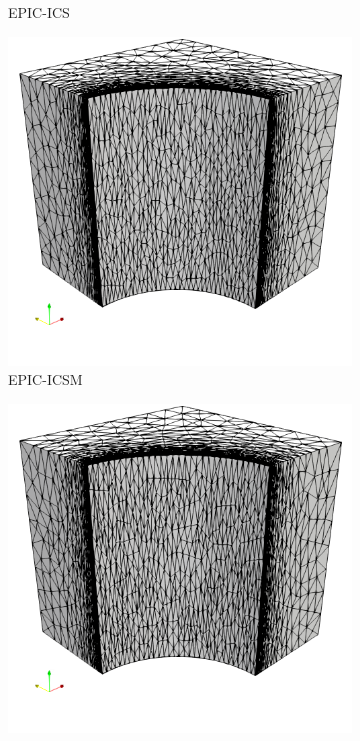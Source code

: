 \documentclass[3p,times,procedia,number]{elsarticle}
\begin{document}
\begin{figure}
\begin{subfigure}{.24\textwidth}
\caption{EPIC-ICS}
\end{subfigure}
\begin{subfigure}{.24\textwidth}
\centering
\includegraphics[width=\textwidth]{epic-icsm-cube-cylinder-polar-2.png}
\caption{EPIC-ICSM}
\end{subfigure}
\begin{subfigure}{.24\textwidth}
\centering
\includegraphics[width=\textwidth]{omega_h-cube-cylinder-polar-2.png}

\end{subfigure}
\end{figure}
\end{document}
